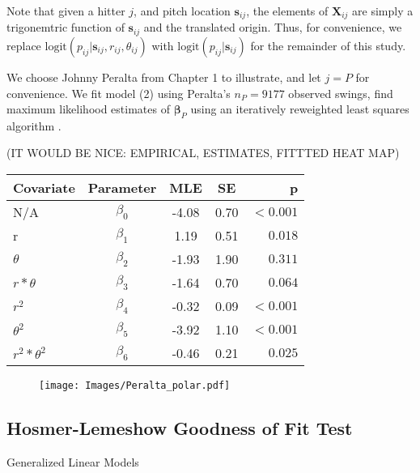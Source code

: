 \documentclass{article}
\begin{document}
Note that given a hitter $j$, and pitch location $\pmb{s}_{ij}$, the elements of $\pmb{X}_{ij}$ are simply a trigonemtric function of $\pmb{s}_{ij}$ and the translated origin. Thus, for convenience, we replace $\text{logit}(p_{ij}|\pmb{s}_{ij}, r_{ij}, \theta_{ij})$ with $\text{logit}(p_{ij}|\pmb{s}_{ij})$ for the remainder of this study.

We choose Johnny Peralta from Chapter 1 to illustrate, and let $j = P$ for convenience. We fit model (2) using Peralta's $n_{P} = 9177$ observed swings, find maximum likelihood estimates of $\pmb{\beta}_{P}$ using an iteratively reweighted least squares algorithm \citep{Myers2012}. 

(IT WOULD BE NICE: EMPIRICAL, ESTIMATES, FITTTED HEAT MAP) \\
\begin{tabular}{ l | c | c | c | r }

    \hline
    Covariate         & Parameter   & MLE   & SE     &      p    \\ \hline \hline
    N/A               & $\beta_{0}$ & -4.08 & 0.70 & $ <0.001$ \\ \hline
    r                 & $\beta_{1}$ &  1.19 & 0.51 & $  0.018$ \\ \hline
    $\theta$          & $\beta_{2}$ & -1.93 & 1.90 & $  0.311$ \\ \hline
    $r*\theta$        & $\beta_{3}$ & -1.64 & 0.70 & $  0.064$ \\ \hline
    $r^{2}$           & $\beta_{4}$ & -0.32 & 0.09 & $ <0.001$ \\ \hline
    $\theta^{2}$      & $\beta_{5}$ & -3.92 & 1.10 & $ <0.001$ \\ \hline
    $r^{2}*\theta^{2}$& $\beta_{6}$ & -0.46 & 0.21 & $  0.025$ \\ \hline
    \hline  

  \end{tabular}

  \begin{figure}[H]
	\texttt{[image: Images/Peralta\_polar.pdf]} 
  \caption{}
  
	\end{figure} 

\subsection{Hosmer-Lemeshow Goodness of Fit Test} %

Generalized Linear Models \citep{Myers2012}
\end{document}
